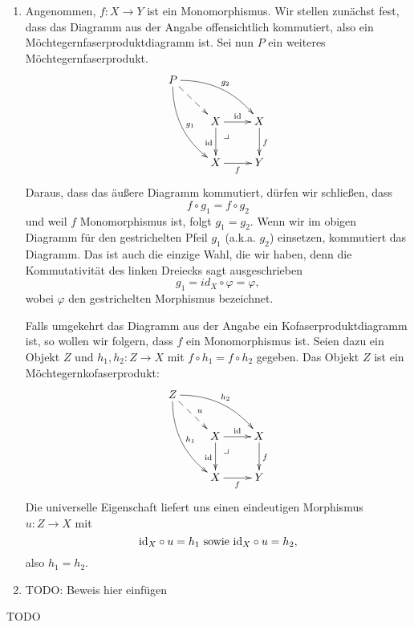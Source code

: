 \documentclass{pizzablatt}
\begin{document}
\begin{aufgabe}{}
\begin{enumerate}
\item Angenommen, $f:X \to Y$ ist ein Monomorphismus. Wir stellen zunächst fest, dass das Diagramm aus der Angabe offensichtlich kommutiert, also ein Möchte\-gern\-faser\-produkt\-diagramm ist. Sei nun $P$ ein weiteres Möchtegernfaserprodukt.
\[ \xymatrix{
  P \ar@/_1pc/[ddr]^{g_{1}} \ar@/^1pc/[rrd]^{g_{2}} \ar@{-->}[rd] \\
  & \ar @{} [dr] |{\begin{array}{l}\lrcorner\ \ \ \ \ \ \\\\\end{array}}
  X \ar[r]^\id \ar[d]_\id & X \ar[d]^f \\
  & X \ar[r]_f & Y
} \]
Daraus, dass das äußere Diagramm kommutiert, dürfen wir schließen, dass
\[ f \circ g_{1} = f \circ g_{2} \]
und weil $f$ Monomorphismus ist, folgt $g_{1} = g_{2}$.
Wenn wir im obigen Diagramm für den gestrichelten Pfeil $g_{1}$ (a.k.a. $g_{2}$) einsetzen, kommutiert das Diagramm. Das ist auch die einzige Wahl, die wir haben, denn die Kommutativität des linken Dreiecks sagt ausgeschrieben
\[ g_{1} = id_{X} \circ \varphi = \varphi, \]
wobei $\varphi$ den gestrichelten Morphismus bezeichnet.

Falls umgekehrt das Diagramm aus der Angabe ein Ko\-faser\-produkt\-diagramm ist, so wollen wir folgern, dass $f$ ein Monomorphismus ist. Seien dazu ein Objekt $Z$ und $h_{1}, h_{2} : Z \to X$ mit $f \circ h_{1} = f \circ h_{2}$ gegeben. Das Objekt $Z$ ist ein Möchte\-gern\-ko\-faser\-produkt:
\[ \xymatrix{
  Z \ar@/_1pc/[ddr]^{h_{1}} \ar@/^1pc/[rrd]^{h_{2}} \ar@{-->}[rd]^{u} \\
  & \ar @{} [dr] |{\begin{array}{l}\lrcorner\ \ \ \ \ \ \\\\\end{array}}
  X \ar[r]^\id \ar[d]_\id & X \ar[d]^f \\
  & X \ar[r]_f & Y
} \]
Die universelle Eigenschaft liefert uns einen eindeutigen Morphismus $u:Z \to X$ mit
\[ \mathrm{id}_{X} \circ u = h_{1} \text{ sowie } \mathrm{id}_{X} \circ u = h_{2}, \]
also $h_{1} = h_{2}$.

\item TODO: Beweis hier einfügen
\end{enumerate}
\end{aufgabe}

\begin{aufgabe}{}
TODO
\end{aufgabe}
\end{document}
